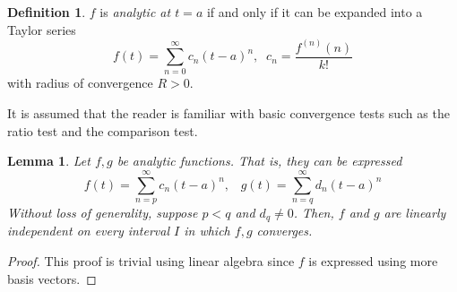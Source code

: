 \documentclass{article}
\newtheorem{lemma}[theorem]{Lemma}
\theoremstyle{remark}
\theoremstyle{definition}
\newtheorem{definition}{Definition}[section]
\begin{document}
\begin{definition}
$f$ is \textit{analytic at $t=a$} if and only if it can be expanded into a Taylor series 
\[f(t) = \sum_{n=0}^\infty c_n (t-a)^n, \;\; c_n = \frac{f^{(n)}(n)}{k!}\]
with radius of convergence $R > 0$. 
\end{definition}
It is assumed that the reader is familiar with basic convergence tests such as the ratio test and the comparison test. 

\begin{lemma}
Let $f, g$ be analytic functions. That is, they can be expressed
\[f(t) = \sum_{n=p}^\infty c_n (t-a)^n, \;\;\; g(t) = \sum_{n=q}^\infty d_n (t-a)^n\]
Without loss of generality, suppose $p < q$ and $d_q \neq 0$. Then, $f$ and $g$ are linearly independent on every interval $I$ in which $f, g$ converges. 
\end{lemma}
\begin{proof}
This proof is trivial using linear algebra since $f$ is expressed using more basis vectors. 
\end{proof}
\end{document}
